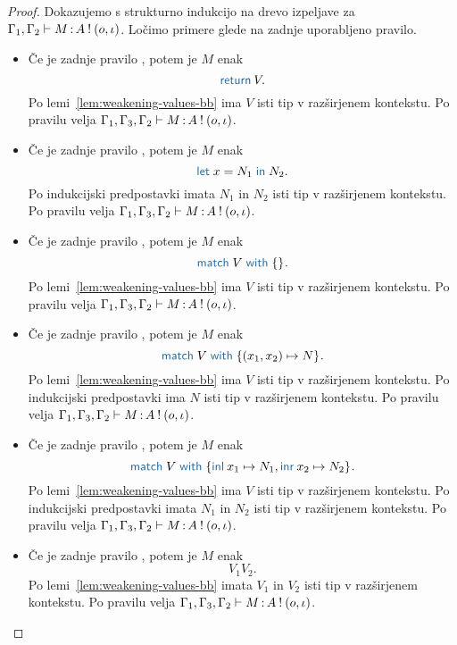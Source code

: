 \begin{proof}
	Dokazujemo s strukturno indukcijo na drevo izpeljave za $\Gamma_1, \Gamma_2 \vdash M \mathinner{:} A \mathbin{!} (o, \iota)$.
	Ločimo primere glede na zadnje uporabljeno pravilo.
	
	\begin{itemize}
		\item Če je zadnje pravilo , potem je $M$ enak $$\tmreturn{V}.$$
		Po lemi~\ref{lem:weakening-values-bb} ima $V$ isti tip v razširjenem kontekstu.
		Po pravilu  velja $\Gamma_1, \Gamma_3, \Gamma_2 \vdash M \mathinner{:} A \mathbin{!} (o, \iota)$.
		
		\item Če je zadnje pravilo , potem je $M$ enak $$\tmlet{x}{N_1}{N_2}.$$
		Po indukcijski predpostavki imata $N_1$ in $N_2$ isti tip v razširjenem kontekstu.
		Po pravilu  velja $\Gamma_1, \Gamma_3, \Gamma_2 \vdash M \mathinner{:} A \mathbin{!} (o, \iota)$.
		
		\item Če je zadnje pravilo , potem je $M$ enak $$\tmmatch{V}{}.$$
		Po lemi~\ref{lem:weakening-values-bb} ima $V$ isti tip v razširjenem kontekstu.
		Po pravilu  velja $\Gamma_1, \Gamma_3, \Gamma_2 \vdash M \mathinner{:} A \mathbin{!} (o, \iota)$.
		
		\item Če je zadnje pravilo , potem je $M$ enak $$\tmmatch{V}{(x_1,x_2) \mapsto N}.$$ 
		Po lemi~\ref{lem:weakening-values-bb} ima $V$ isti tip v razširjenem kontekstu.
		Po indukcijski predpostavki ima $N$ isti tip v razširjenem kontekstu.
		Po pravilu  velja $\Gamma_1, \Gamma_3, \Gamma_2 \vdash M \mathinner{:} A \mathbin{!} (o, \iota)$.
		
		\item Če je zadnje pravilo , potem je $M$ enak $$\tmmatch{V}{\tminl{x_1} \mapsto N_1, \tminr{x_2} \mapsto N_2}.$$
		Po lemi~\ref{lem:weakening-values-bb} ima $V$ isti tip v razširjenem kontekstu.
		Po indukcijski predpostavki imata $N_1$ in $N_2$ isti tip v razširjenem kontekstu.
		Po pravilu  velja $\Gamma_1, \Gamma_3, \Gamma_2 \vdash M \mathinner{:} A \mathbin{!} (o, \iota)$.
		
		\item Če je zadnje pravilo , potem je $M$ enak $$V_1 V_2.$$
		Po lemi~\ref{lem:weakening-values-bb} imata $V_1$ in $V_2$ isti tip v razširjenem kontekstu.
		Po pravilu  velja $\Gamma_1, \Gamma_3, \Gamma_2 \vdash M \mathinner{:} A \mathbin{!} (o, \iota)$.
		

\end{itemize}
\end{proof}

